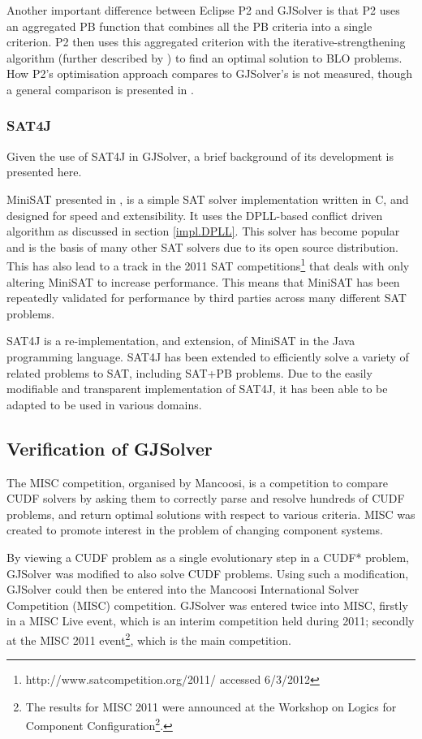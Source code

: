 Another important difference between Eclipse P2 and GJSolver is that P2 uses an aggregated PB function \citep{marque2011blex} that combines all the PB criteria into a single criterion.
P2 then uses this aggregated criterion with the iterative-strengthening algorithm (further described by \cite{leBerre2010}) to find an optimal solution to BLO problems.  
How P2's optimisation approach compares to GJSolver's is not measured, though a general comparison is presented in \cite{marque2011blex}.

\subsubsection{SAT4J}
Given the use of SAT4J in GJSolver, a brief background of its development is presented here.

MiniSAT presented in \citep{een2003}, is a simple SAT solver implementation written in C, and designed for speed and extensibility.
It uses the DPLL-based conflict driven algorithm as discussed in section \ref{impl.DPLL}.
This solver has become popular and is the basis of many other SAT solvers due to its open source distribution.
This has also lead to a track in the 2011 SAT competitions\footnote{http://www.satcompetition.org/2011/ accessed 6/3/2012} that deals with only altering MiniSAT to increase performance.
This means that MiniSAT has been repeatedly validated for performance by third parties across many different SAT problems. 

SAT4J \citep{le2010sat4j} is a re-implementation, and extension, of MiniSAT in the Java programming language.
SAT4J has been extended to efficiently solve a variety of related problems to SAT, including SAT+PB problems.
Due to the easily modifiable and transparent implementation of SAT4J, it has been able to be adapted to be used in various domains.

\subsection{Verification of GJSolver}
\label{impl.verif}
The MISC competition, organised by Mancoosi, is a competition to compare CUDF solvers by asking them to correctly parse and resolve hundreds of CUDF problems, 
and return optimal solutions with respect to various criteria.
MISC was created to promote interest in the problem of changing component systems.

By viewing a CUDF problem as a single evolutionary step in a CUDF* problem, GJSolver was modified to also solve CUDF problems.
Using such a modification, GJSolver could then be entered into the Mancoosi International Solver Competition (MISC) competition.
GJSolver was entered twice into MISC, firstly in a MISC Live event, which is an interim competition held during 2011;
secondly at the MISC 2011 event\footnote{The results for MISC 2011 were announced at the Workshop on Logics for Component Configuration\footnote{http://www.pps.jussieu.fr/~treinen/lococo/2011/ accessed 6/3/2012}.}, 
which is the main competition. 

